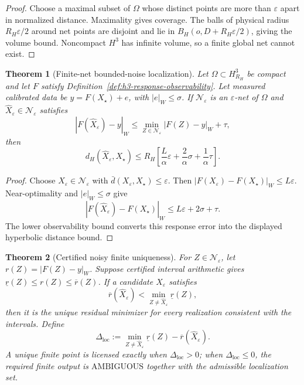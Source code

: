 \documentclass[11pt]{article}
\newtheorem{theorem}{Theorem}[section]
\begin{document}
\begin{proof}
Choose a maximal subset of \(\Omega\) whose distinct points are more than
\(\varepsilon\) apart in normalized distance. Maximality gives coverage. The
balls of physical radius \(R_H\varepsilon/2\) around net points are disjoint
and lie in \(B_H(o,D+R_H\varepsilon/2)\), giving the volume bound. Noncompact
\(H^3\) has infinite volume, so a finite global net cannot exist.
\end{proof}

\begin{theorem}[Finite-net bounded-noise localization]
\label{thm:h3-finite-net-localization}
Let \(\Omega\subset H^3_{R_H}\) be compact and let \(F\) satisfy
Definition~\ref{def:h3-response-observability}. Let measured calibrated data
be \(y=F(X_\star)+e\), with \(|e|_W\leq\sigma\). If
\(\mathcal N_\varepsilon\) is an \(\varepsilon\)-net of \(\Omega\) and
\(\widehat X_\varepsilon\in\mathcal N_\varepsilon\) satisfies
\[
|F(\widehat X_\varepsilon)-y|_W
\leq
\min_{Z\in\mathcal N_\varepsilon}|F(Z)-y|_W+\tau,
\]
then
\[
d_H(\widehat X_\varepsilon,X_\star)
\leq
R_H\left[
\frac L\alpha\varepsilon+\frac2\alpha\sigma+\frac1\alpha\tau
\right].
\]
\end{theorem}

\begin{proof}
Choose \(X_\varepsilon\in\mathcal N_\varepsilon\) with
\(\bar d(X_\varepsilon,X_\star)\leq\varepsilon\). Then
\(|F(X_\varepsilon)-F(X_\star)|_W\leq L\varepsilon\). Near-optimality and
\(|e|_W\leq\sigma\) give
\[
|F(\widehat X_\varepsilon)-F(X_\star)|_W\leq L\varepsilon+2\sigma+\tau.
\]
The lower observability bound converts this response error into the displayed
hyperbolic distance bound.
\end{proof}

\begin{theorem}[Certified noisy finite uniqueness]\label{thm:h3-certified-noisy-uniqueness}
For \(Z\in\mathcal N_\varepsilon\), let \(r(Z)=|F(Z)-y|_W\). Suppose certified
interval arithmetic gives \(\underline r(Z)\leq r(Z)\leq\overline r(Z)\). If a
candidate \(\widehat X_\varepsilon\) satisfies
\[
\overline r(\widehat X_\varepsilon)
<
\min_{Z\neq\widehat X_\varepsilon}\underline r(Z),
\]
then it is the unique residual minimizer for every realization consistent with
the intervals. Define
\[
\Delta_{\mathrm{loc}}
:=
\min_{Z\neq\widehat X_\varepsilon}\underline r(Z)
-\overline r(\widehat X_\varepsilon).
\]
A unique finite point is licensed exactly when \(\Delta_{\mathrm{loc}}>0\);
when \(\Delta_{\mathrm{loc}}\leq0\), the required finite output is
\(\mathrm{AMBIGUOUS}\) together with the admissible localization set.
\end{theorem}
\end{document}
